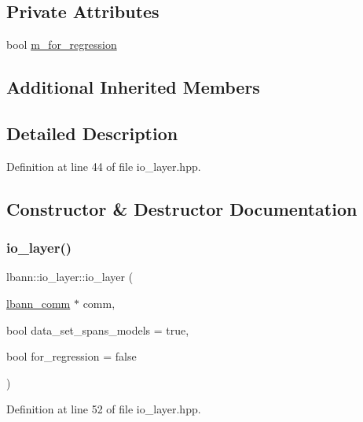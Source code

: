 \subsection*{Private Attributes}
\begin{DoxyCompactItemize}
\item 
bool \hyperlink{classlbann_1_1io__layer_aa1410291168d197a59b47815cced48d4}{m\+\_\+for\+\_\+regression}
\end{DoxyCompactItemize}
\subsection*{Additional Inherited Members}


\subsection{Detailed Description}


Definition at line 44 of file io\+\_\+layer.\+hpp.



\subsection{Constructor \& Destructor Documentation}
\mbox{\label{classlbann_1_1io__layer_ab2b5002dfeb0806062ecf3d9fefb9948}} 
\subsubsection{\texorpdfstring{io\+\_\+layer()}{io\_layer()}}
{\footnotesize\ttfamily lbann\+::io\+\_\+layer\+::io\+\_\+layer (\begin{DoxyParamCaption}\item[{\hyperlink{classlbann_1_1lbann__comm}{lbann\+\_\+comm} $\ast$}]{comm,  }\item[{bool}]{data\+\_\+set\+\_\+spans\+\_\+models = {\ttfamily true},  }\item[{bool}]{for\+\_\+regression = {\ttfamily false} }\end{DoxyParamCaption})\hspace{0.3cm}{\ttfamily [inline]}}



Definition at line 52 of file io\+\_\+layer.\+hpp.


